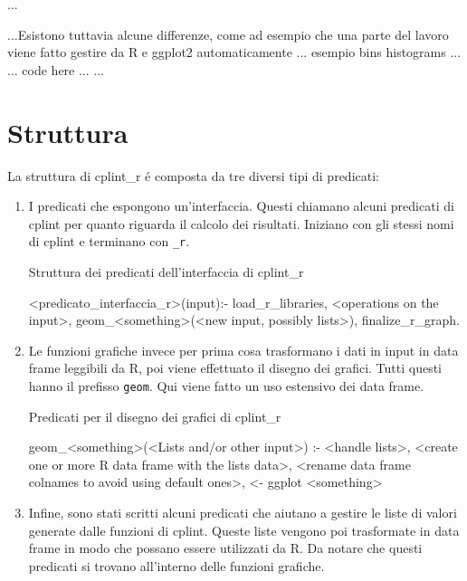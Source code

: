 \documentclass[10pt,titlepage,twoside,a4paper]{report}
\newenvironment{code}{\singlespacing\captionsetup{type=listing}}{}
\begin{document}
...

...Esistono tuttavia alcune differenze, come ad esempio che una 
parte del lavoro viene fatto gestire da R e ggplot2 automaticamente ... esempio 
bins histograms ... ... code here ...
...

\section{Struttura}
La struttura di cplint\_r \'e composta da tre diversi tipi di predicati:
\begin{enumerate}
    \item I predicati che espongono un'interfaccia. Questi chiamano alcuni 
          predicati di cplint per quanto riguarda il calcolo dei risultati. 
Iniziano con gli stessi nomi di cplint e terminano con \texttt{\_r}.

        \begin{code}
            \caption{Struttura dei predicati dell'interfaccia di cplint\_r}
            \begin{prologcode*}{}
<predicato_interfaccia_r>(input):-
    load_r_libraries,
    <operations on the input>,
    geom_<something>(<new input, possibly lists>),
    finalize_r_graph.
            \end{prologcode*}
        \end{code}
    \item Le funzioni grafiche invece per prima cosa trasformano i dati in 
          input in data frame leggibili da R, poi viene effettuato il disegno 
          dei grafici. Tutti questi hanno il prefisso \texttt{geom}. Qui viene 
fatto un uso estensivo dei data frame.

    \begin{code}
        \caption{Predicati per il disegno dei grafici di cplint\_r}
        \begin{prologcode*}{}
geom_<something>(<Lists and/or other input>) :-
    <handle lists>,
    <create one or more R data frame with the lists data>,
    <rename data frame colnames to avoid using default ones>,
    <- ggplot <something>
        \end{prologcode*}
    \end{code}
    \item Infine, sono stati scritti alcuni predicati che aiutano a gestire le 
          liste di valori generate dalle funzioni di cplint. Queste liste 
          vengono poi trasformate in data frame in modo che possano 
          essere utilizzati da R. Da notare che questi predicati si trovano 
all'interno delle funzioni grafiche.
\end{enumerate}
\end{document}

